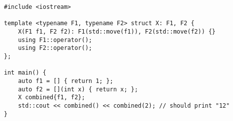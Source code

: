 \begin{lstlisting}[title=\href{https://godbolt.org/z/nMNbMZ}{\texttt{godbolt.org/z/nMNbMZ}}]
#include <iostream>

template <typename F1, typename F2> struct X: F1, F2 {
    X(F1 f1, F2 f2): F1(std::move(f1)), F2(std::move(f2)) {}
    using F1::operator();
    using F2::operator();
};

int main() {
    auto f1 = [] { return 1; };
    auto f2 = [](int x) { return x; };
    X combined{f1, f2};
    std::cout << combined() << combined(2); // should print "12"
}
\end{lstlisting}
